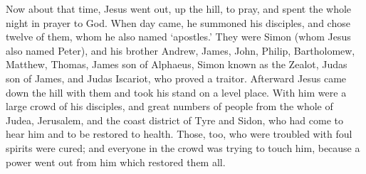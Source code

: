  Now about that time, Jesus went out, up the hill, to pray,
and spent the whole night in prayer to God.  When day came,
he summoned his disciples, and chose twelve of them, whom he also named
`apostles.'  They were Simon (whom Jesus also named Peter),
and his brother Andrew, James, John, Philip, Bartholomew, 
Matthew, Thomas, James son of Alphaeus, Simon known as the Zealot,
 Judas son of James, and Judas Iscariot, who proved a
traitor.  Afterward Jesus came down the hill with them and
took his stand on a level place. With him were a large crowd of his
disciples, and great numbers of people from the whole of Judea,
Jerusalem, and the coast district of Tyre and Sidon,  who
had come to hear him and to be restored to health. Those, too, who were
troubled with foul spirits were cured;  and everyone in the
crowd was trying to touch him, because a power went out from him which
restored them all.

